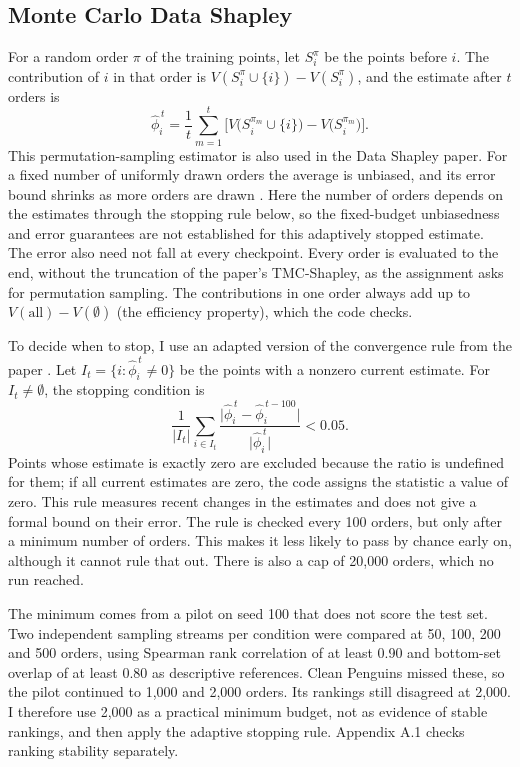 \documentclass[10pt]{article}
\begin{document}
\subsection{Monte Carlo Data Shapley}
For a random order $\pi$ of the training points, let $S_i^\pi$ be the points before $i$. The contribution of $i$ in that order is $V(S_i^\pi\cup\{i\})-V(S_i^\pi)$, and the estimate after $t$ orders is
\[
\widehat{\phi}_i^{\,t}=\frac{1}{t}\sum_{m=1}^{t}\Big[V\big(S_i^{\pi_m}\cup\{i\}\big)-V\big(S_i^{\pi_m}\big)\Big].
\]
This permutation-sampling estimator is also used in the Data Shapley paper. For a fixed number of uniformly drawn orders the average is unbiased, and its error bound shrinks as more orders are drawn \citep{maleki2013}. Here the number of orders depends on the estimates through the stopping rule below, so the fixed-budget unbiasedness and error guarantees are not established for this adaptively stopped estimate. The error also need not fall at every checkpoint. Every order is evaluated to the end, without the truncation of the paper's TMC-Shapley, as the assignment asks for permutation sampling. The contributions in one order always add up to $V(\text{all})-V(\emptyset)$ (the efficiency property), which the code checks.

To decide when to stop, I use an adapted version of the convergence rule from the paper \citep{ghorbani2019}. Let $I_t=\{i:\widehat{\phi}_i^{\,t}\ne 0\}$ be the points with a nonzero current estimate. For $I_t\ne\emptyset$, the stopping condition is
\[
\frac{1}{|I_t|}\sum_{i\in I_t}\frac{\big|\widehat{\phi}_i^{\,t}-\widehat{\phi}_i^{\,t-100}\big|}{\big|\widehat{\phi}_i^{\,t}\big|}<0.05 .
\]
Points whose estimate is exactly zero are excluded because the ratio is undefined for them; if all current estimates are zero, the code assigns the statistic a value of zero. This rule measures recent changes in the estimates and does not give a formal bound on their error. The rule is checked every 100 orders, but only after a minimum number of orders. This makes it less likely to pass by chance early on, although it cannot rule that out. There is also a cap of 20,000 orders, which no run reached.

The minimum comes from a pilot on seed 100 that does not score the test set. Two independent sampling streams per condition were compared at 50, 100, 200 and 500 orders, using Spearman rank correlation of at least 0.90 and bottom-set overlap of at least 0.80 as descriptive references. Clean Penguins missed these, so the pilot continued to 1,000 and 2,000 orders. Its rankings still disagreed at 2,000. I therefore use 2,000 as a practical minimum budget, not as evidence of stable rankings, and then apply the adaptive stopping rule. Appendix A.1 checks ranking stability separately.
\end{document}
